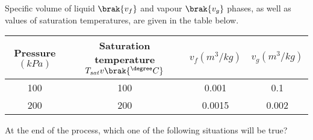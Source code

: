 Specific volume of liquid $\brak{v_f}$
 and vapour $\brak{v_g}$
 phases, as well as values of saturation temperatures, are given in the table below.
 \begin{table}[H]
     \centering
     \begin{tabular}{|c|c|c|c|}
\hline
     Pressure$(kPa)$ & Saturation temperature $T_{sat}v\brak{^{\degree} C}$ 
     & $v_f(m^3 /kg)$ & $v_g (m^3 / kg)$ \\
     \hline 
     100 & 100 & 0.001 & 0.1 \\
     \hline
     200 & 200 & 0.0015 & 0.002 \\
     \hline
\end{tabular}

 \end{table}
 \item At the end of the process, which one of the following situations will be true? \label{71} 

